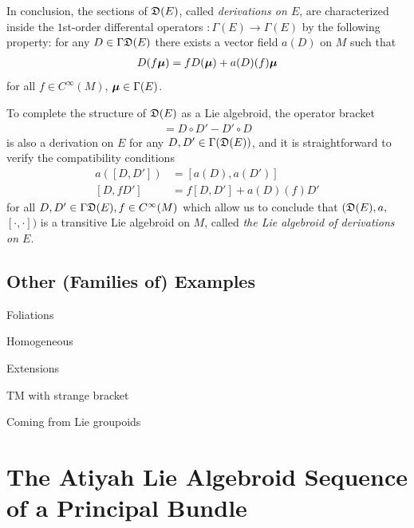 In conclusion, the sections of $\mathfrak{D}(E)$, called \emph{derivations on $E$}, are characterized inside the $1$st-order differental operators $:\Gamma(E) \to \Gamma(E)$ by the following property: for any $D \in \Gamma \mathfrak{D}(E)$ there exists a vector field $a(D)$ on $M$ such that
\begin{align}
    D(f \bm{\mu}) = f D(\bm{\mu}) + a(D)(f) \bm{\mu}
\end{align}
for all $f \in C^\infty(M)$, $\bm{\mu} \in \Gamma(E)$.

To complete the structure of $\mathfrak{D}(E)$ as a Lie algebroid, the operator bracket
\begin{align*}
    [D, D'] = D \circ D' - D' \circ D
\end{align*}
is also a derivation on $E$ for any $D, D' \in \Gamma(\mathfrak{D}(E))$, and it is straightforward to verify the compatibility conditions
\begin{align}
    a([D, D']) &= [a(D), a(D')] \\
    [D, f D'] &= f[D, D'] + a(D)(f) D'
\end{align}
for all $D, D' \in \Gamma \mathfrak{D}(E), f \in C^\infty(M)$ which allow us to conclude that $(\mathfrak{D}(E), a, $ $[\cdot, \cdot])$ is a transitive Lie algebroid on $M$, called \emph{the Lie algebroid of derivations on $E$}.

\subsection{Other (Families of) Examples}

Foliations

Homogeneous

Extensions

TM with strange bracket

Coming from Lie groupoids

\section{The Atiyah Lie Algebroid Sequence of a Principal Bundle}

